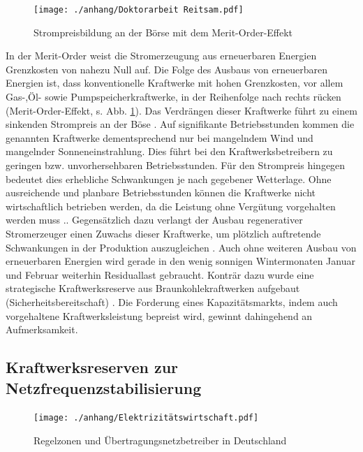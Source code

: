 		\begin{figure} [H]
			\centering
			\label{Abb. Strompreisbildung Merit Order}
			\texttt{[image: ./anhang/Doktorarbeit Reitsam.pdf]}
			\caption{Strompreisbildung an der Börse mit dem Merit-Order-Effekt \parencite{Doktorarbeit_Reitsam}}
		\end{figure}
		
		In der Merit-Order weist die Stromerzeugung aus erneuerbaren Energien Grenzkosten von nahezu Null auf.
		Die Folge des Ausbaus von erneuerbaren Energien ist, dass konventionelle Kraftwerke mit hohen Grenzkosten, vor allem Gas-,Öl- sowie Pumpspeicherkraftwerke, in der Reihenfolge nach rechts rücken (Merit-Order-Effekt, s. Abb. \ref{Abb. Strompreisbildung Merit Order}).
		Das Verdrängen dieser Kraftwerke führt zu einem sinkenden Strompreis an der Böse \parencite{Frauenhofer_PV_Bericht}.
		Auf signifikante Betriebsstunden kommen die genannten Kraftwerke dementsprechend nur bei mangelndem Wind und mangelnder Sonneneinstrahlung.
		Dies führt bei den Kraftwerksbetreibern zu geringen bzw. unvorhersehbaren Betriebsstunden. 
 		Für den Strompreis hingegen bedeutet dies erhebliche Schwankungen je nach gegebener Wetterlage.
		Ohne ausreichende und planbare Betriebsstunden können die Kraftwerke nicht wirtschaftlich betrieben werden, da die Leistung ohne Vergütung vorgehalten werden muss \parencite{Frauenhofer_PV_Bericht}..
		Gegensätzlich dazu verlangt der Ausbau regenerativer Stromerzeuger einen Zuwachs dieser Kraftwerke, um plötzlich auftretende Schwankungen in der Produktion auszugleichen \parencite{Doktorarbeit_Reitsam}.
		Auch ohne weiteren Ausbau von erneuerbaren Energien wird gerade in den wenig sonnigen Wintermonaten Januar und Februar weiterhin Residuallast gebraucht.
		Konträr dazu wurde eine strategische Kraftwerksreserve aus Braunkohlekraftwerken aufgebaut (Sicherheitsbereitschaft) \parencite{bbh_blog}.		
		Die Forderung eines Kapazitätsmarkts, indem auch vorgehaltene Kraftwerksleistung bepreist wird, gewinnt dahingehend an Aufmerksamkeit.
		
	\subsection{Kraftwerksreserven zur Netzfrequenzstabilisierung}
	
		\begin{figure}
			\centering
			\texttt{[image: ./anhang/Elektrizitätswirtschaft.pdf]}
			\caption{Regelzonen und Übertragungsnetzbetreiber in Deutschland \parencite{Elektrizitätswirtschaft}}
			\label{Abb. Regelzonen Deutschland}
		\end{figure}
	

